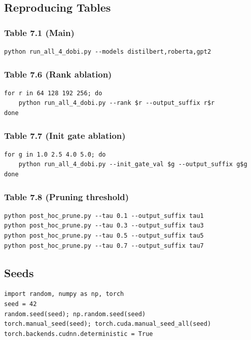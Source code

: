 \subsection{Reproducing Tables}

\subsubsection{Table 7.1 (Main)}
\begin{lstlisting}
python run_all_4_dobi.py --models distilbert,roberta,gpt2
\end{lstlisting}

\subsubsection{Table 7.6 (Rank ablation)}
\begin{lstlisting}
for r in 64 128 192 256; do
    python run_all_4_dobi.py --rank $r --output_suffix r$r
done
\end{lstlisting}

\subsubsection{Table 7.7 (Init gate ablation)}
\begin{lstlisting}
for g in 1.0 2.5 4.0 5.0; do
    python run_all_4_dobi.py --init_gate_val $g --output_suffix g$g
done
\end{lstlisting}

\subsubsection{Table 7.8 (Pruning threshold)}
\begin{lstlisting}
python post_hoc_prune.py --tau 0.1 --output_suffix tau1
python post_hoc_prune.py --tau 0.3 --output_suffix tau3
python post_hoc_prune.py --tau 0.5 --output_suffix tau5
python post_hoc_prune.py --tau 0.7 --output_suffix tau7
\end{lstlisting}

\subsection{Seeds}

\begin{lstlisting}
import random, numpy as np, torch
seed = 42
random.seed(seed); np.random.seed(seed)
torch.manual_seed(seed); torch.cuda.manual_seed_all(seed)
torch.backends.cudnn.deterministic = True
\end{lstlisting}

